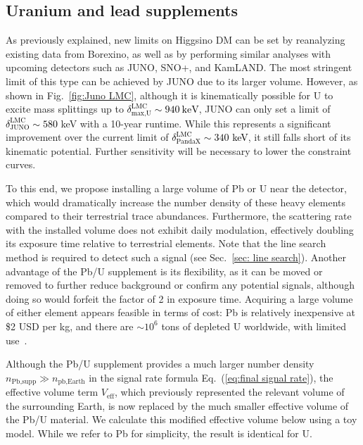 \documentclass[aps,prd,amsmath,amssymb,10pt,letterpaper,balancelastpage,showpacs,superscriptaddress,nofootinbib,floatfix,notitlepage,longbibliography,twocolumn
]{revtex4-2}
\newcommand{\numcolor}[1]{\textcolor{black}{#1}}
\newcommand{\Eq}[1]{Eq.~(#1)}
\newcommand{\Veff}{V_{\text{eff}}}
\newcommand{\npb}{n_\text{Pb,supp}}
\begin{document}
\subsection{Uranium and lead supplements\label{sec:supplement}}
As previously explained, new limits on Higgsino DM can be set by reanalyzing existing data from Borexino, as well as by performing similar analyses with upcoming detectors such as JUNO, SNO+, and KamLAND. The most stringent limit of this type can be achieved by JUNO due to its larger volume. However, as shown in Fig.~\ref{fig:Juno LMC}, although it is kinematically possible for U to excite mass splittings up to \numcolor{$\delta^{\text{LMC}}_{\text{max,U}} \sim 940~\text{keV}$}, JUNO can only set a limit of \numcolor{$\delta^{\text{LMC}}_{\text{JUNO}} \sim 580$} keV with a 10-year runtime. While this represents a significant improvement over the current limit of \numcolor{$\delta^{\text{LMC}}_{\text{PandaX}} \sim 340$ keV}, it still falls short of its kinematic potential. Further sensitivity will be necessary to lower the constraint curves.

To this end, we propose installing a large volume of Pb or U near the detector, which would dramatically increase the number density of these heavy elements compared to their terrestrial trace abundances. Furthermore, the scattering rate with the installed volume does not exhibit daily modulation, effectively doubling its exposure time relative to terrestrial elements. Note that the line search method is required to detect such a signal (see Sec.~\ref{sec: line search}). Another advantage of the Pb/U supplement is its flexibility, as it can be moved or removed to further reduce background or confirm any potential signals, although doing so would forfeit the factor of 2 in exposure time. Acquiring a large volume of either element appears feasible in terms of cost: Pb is relatively inexpensive at \$2 USD per kg, and there are $\sim 10^6$ tons of depleted U worldwide, with limited use~\cite{depleteduranium}.

Although the Pb/U supplement provides a much larger number density $\npb \gg n_{\text{pb,Earth}}$ in the signal rate formula \Eq{\ref{eq:final signal rate}}, the effective volume term $\Veff$, which previously represented the relevant volume of the surrounding Earth, is now replaced by the much smaller effective volume of the Pb/U material. We calculate this modified effective volume below using a toy model. While we refer to Pb for simplicity, the result is identical for U.
\end{document}
